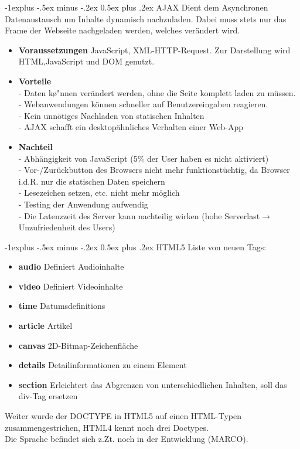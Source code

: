 \documentclass[10pt,landscape]{article}
\makeatletter
\renewcommand{\subsection}{\@startsection{subsection}{2}{0mm}%
                                {-1explus -.5ex minus -.2ex}%
                                {0.5ex plus .2ex}%
                                {\normalfont\normalsize\bfseries}}
\makeatother
\begin{document}
\begin{multicols}{3}
\subsection{AJAX}
Dient dem Asynchronen Datenaustausch um Inhalte dynamisch nachzuladen. Dabei muss stets nur das Frame der Webseite nachgeladen werden, welches ver\"andert wird.\\
\begin{itemize}
    \item \textbf{Voraussetzungen} JavaScript, XML-HTTP-Request. Zur Darstellung wird HTML,JavaScript und DOM genutzt.
    \item \textbf{Vorteile} \\
    - Daten k\o"nnen ver\"andert werden, ohne die Seite komplett laden zu m\"ussen.\\
    - Webanwendungen k\"onnen schneller auf Benutzereingaben reagieren.\\
    - Kein unn\"otiges Nachladen von statischen Inhalten\\
    - AJAX schafft ein desktopähnliches Verhalten einer Web-App
    \item \textbf{Nachteil}\\
    - Abh\"angigkeit von JavaScript (5\% der User haben es nicht aktiviert)\\
    - Vor-/Zur\"uckbutton des Browsers nicht mehr funktionst\"uchtig, da Browser i.d.R. nur die statischen Daten speichern\\
    - Lesezeichen setzen, etc. nicht mehr m\"oglich\\
    - Testing der Anwendung aufwendig\\
    - Die Latenzzeit des Server kann nachteilig wirken (hohe Serverlast$\rightarrow$Unzufriedenheit des Users)
\end{itemize}

\subsection{HTML5}
Liste von neuen Tags:
\begin{itemize}
    \item \textbf{audio} Definiert Audioinhalte
    \item \textbf{video} Definiert Videoinhalte
    \item \textbf{time} Datumsdefinitions
    \item \textbf{article} Artikel
    \item \textbf{canvas}  2D-Bitmap-Zeichenfl\"ache
    \item \textbf{details} Detailinformationen zu einem Element
    \item \textbf{section} Erleichtert das Abgrenzen von unterschiedlichen Inhalten, soll das div-Tag ersetzen
\end{itemize}
Weiter wurde der DOCTYPE in HTML5 auf einen HTML-Typen zusammengestrichen, HTML4 kennt noch drei Doctypes.\\
Die Sprache befindet sich z.Zt. noch in der Entwicklung (MARCO).


\end{multicols}
\end{document}

